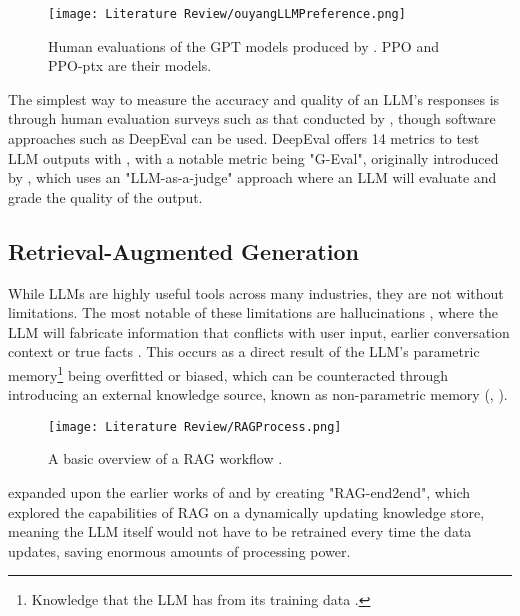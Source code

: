 \begin{figure}[H] 
    \centering
    \texttt{[image: Literature Review/ouyangLLMPreference.png]}
    \caption{Human evaluations of the GPT models produced by \textcite{ouyang_training_2022}. PPO and PPO-ptx are their models.}
    \label{fig:LLMPref}
\end{figure}

The simplest way to measure the accuracy and quality of an LLM's responses is through human evaluation surveys such as that conducted by \textcite{ouyang_training_2022}, though
software approaches such as DeepEval can be used. DeepEval offers 14 metrics to test LLM outputs with \autocite{deepeval_introduction_2024},
with a notable metric being "G-Eval", originally introduced by \textcite{liu_g-eval_2023}, which uses an "LLM-as-a-judge" approach where an LLM will evaluate
and grade the quality of the output.


\subsection{Retrieval-Augmented Generation}\label{sec:LitReviewRAG}

While LLMs are highly useful tools across many industries, they are not without limitations. The most notable 
of these limitations are hallucinations \autocite{lewis_retrieval-augmented_2021}, where the LLM will fabricate 
information that conflicts with user input, earlier conversation context or true facts \autocite{zhang_sirens_2023}. This occurs as a direct result of the LLM's parametric memory\footnote{Knowledge that the LLM has from its training data \autocite{siriwardhana_improving_2023}.}
being overfitted or biased, which can be counteracted through introducing an external knowledge source, known as non-parametric memory (\textcite{komeili_internet-augmented_2022}, \textcite{siriwardhana_improving_2023}).

\begin{figure}[H] 
    \centering
    \texttt{[image: Literature Review/RAGProcess.png]}
    \caption{A basic overview of a RAG workflow \autocite{openai_retrieval_nodate}.}
    \label{fig:RAGProcess}
\end{figure}

\textcite{siriwardhana_improving_2023} expanded upon the earlier works of \textcite{karpukhin_dense_2020} and \textcite{lewis_pre-training_2020} by creating 
"RAG-end2end", which explored the capabilities of RAG on a dynamically updating knowledge store, meaning the LLM itself would not have to be retrained 
every time the data updates, saving enormous amounts of processing power.

